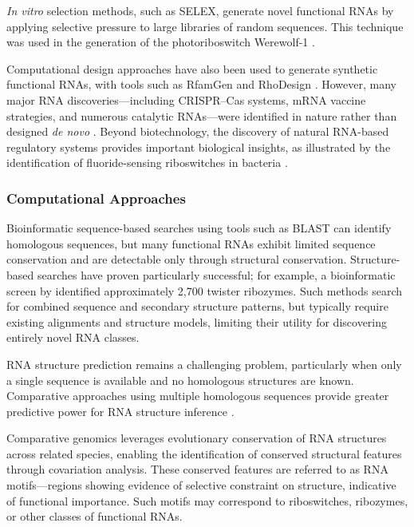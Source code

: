 \documentclass{article}
\begin{document}
\emph{In vitro} selection methods, such as SELEX, generate novel functional RNAs by applying selective pressure to large libraries of random sequences.
This technique was used in the generation of the photoriboswitch Werewolf-1 \parencite{Rotstan2020}.

Computational design approaches have also been used to generate synthetic functional RNAs, with tools such as RfamGen and RhoDesign \parencite{Sumi2024}.
However, many major RNA discoveries—including CRISPR--Cas systems, mRNA vaccine strategies, and numerous catalytic RNAs—were identified in nature rather than designed \emph{de novo} \parencite{Micura2020, Barrangou2007}.
Beyond biotechnology, the discovery of natural RNA-based regulatory systems provides important biological insights, as illustrated by the identification of fluoride-sensing riboswitches in bacteria \parencite{Breaker2012}.

\subsubsection*{Computational Approaches}

Bioinformatic sequence-based searches using tools such as BLAST can identify homologous sequences, but many functional RNAs exhibit limited sequence conservation and are detectable only through structural conservation.
Structure-based searches have proven particularly successful; for example, a bioinformatic screen by \textcite{Roth2014} identified approximately 2,700 twister ribozymes.
Such methods search for combined sequence and secondary structure patterns, but typically require existing alignments and structure models, limiting their utility for discovering entirely novel RNA classes.

RNA structure prediction remains a challenging problem, particularly when only a single sequence is available and no homologous structures are known.
Comparative approaches using multiple homologous sequences provide greater predictive power for RNA structure inference \parencite{Kagaya2026}.

Comparative genomics leverages evolutionary conservation of RNA structures across related species, enabling the identification of conserved structural features through covariation analysis.
These conserved features are referred to as RNA motifs—regions showing evidence of selective constraint on structure, indicative of functional importance.
Such motifs may correspond to riboswitches, ribozymes, or other classes of functional RNAs.
\end{document}
